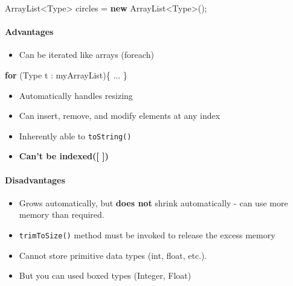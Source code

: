 \documentclass[]{article}
\newenvironment{Shaded}{}{}
\newcommand{\BuiltInTok}[1]{#1}
\newcommand{\KeywordTok}[1]{\textcolor[rgb]{0.00,0.44,0.13}{\textbf{#1}}}
\newcommand{\NormalTok}[1]{#1}
\providecommand{\tightlist}{%
  \setlength{\itemsep}{0pt}\setlength{\parskip}{0pt}}
\let\oldparagraph\paragraph
\renewcommand{\paragraph}[1]{\oldparagraph{#1}\mbox{}}
\begin{document}
\begin{Shaded}
\begin{Highlighting}[]
\BuiltInTok{ArrayList}\NormalTok{<}\BuiltInTok{Type}\NormalTok{> circles = }\KeywordTok{new} \BuiltInTok{ArrayList}\NormalTok{<}\BuiltInTok{Type}\NormalTok{>();    }
\end{Highlighting}
\end{Shaded}

\hypertarget{advantages}{%
\paragraph{Advantages}\label{advantages}}

\begin{itemize}
\tightlist
\item
  Can be iterated like arrays (foreach)
\end{itemize}

\begin{Shaded}
\begin{Highlighting}[]
\KeywordTok{for}\NormalTok{ (}\BuiltInTok{Type}\NormalTok{ t : myArrayList)\{}
\NormalTok{    ...}
\NormalTok{\}}
\end{Highlighting}
\end{Shaded}

\begin{itemize}
\tightlist
\item
  Automatically handles resizing
\item
  Can insert, remove, and modify elements at any index
\item
  Inherently able to \texttt{toString()}
\item
  \textbf{Can't be indexed({[} {]})}
\end{itemize}

\hypertarget{disadvantages}{%
\paragraph{Disadvantages}\label{disadvantages}}

\begin{itemize}
\tightlist
\item
  Grows automatically, but \textbf{does not} shrink automatically - can
  use more memory than required.
\item
  \texttt{trimToSize()} method must be invoked to release the excess
  memory
\item
  Cannot store primitive data types (int, float, etc.).
\item
  But you can used boxed types (Integer, Float)
\end{itemize}
\end{document}
